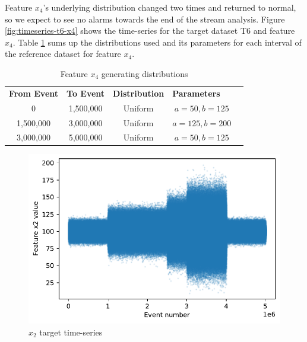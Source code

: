 \documentclass[sigconf]{acmart}
\begin{document}
Feature $x_4$'s underlying distribution changed two times and returned to normal, so we expect to see no alarms towards the end of the stream analysis. Figure \ref{fig:timeseries-t6-x4} shows the time-series for the target dataset T6 and feature $x_4$. Table \ref{tbl:multi-feat-x4-changes} sums up the distributions used and its parameters for each interval of the reference dataset for feature $x_4$.
\begin{table}[!htb]
    \begin{center}
    \begin{tabular}{|c|c|c|c|l}
    \cline{1-4}
    \textbf{From Event} & \textbf{To Event} & \textbf{Distribution} & \multicolumn{1}{l|}{\textbf{Parameters}} &  \\ \cline{1-4}
    0                   & 1,500,000         & Uniform               & $a=50, b=125$                            &  \\ \cline{1-4}
    1,500,000           & 3,000,000         & Uniform               & $a=125, b=200$                           &  \\ \cline{1-4}
    3,000,000           & 5,000,000         & Uniform               & $a=50, b=125$                            &  \\ \cline{1-4}
    \end{tabular}
    \end{center}
    \caption{Feature $x_4$ generating distributions}
    \label{tbl:multi-feat-x4-changes}
\end{table}
\begin{figure}[!htb]
    \begin{center}
      \includegraphics[scale=0.5]{figures/timeseries-t6-x2.pdf} 
      \caption{$x_2$ target time-series} 
      \label{fig:timeseries-t6-x2} 
    \end{center}
\end{figure}
\end{document}
